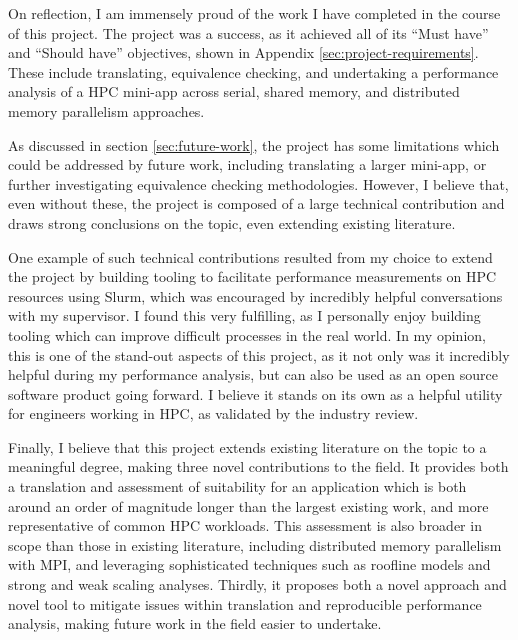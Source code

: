 On reflection, I am immensely proud of the work I have completed in the course of this project. The project was a success, as it achieved all of its ``Must have'' and ``Should have'' objectives, shown in Appendix \ref{sec:project-requirements}. These include translating, equivalence checking, and undertaking a performance analysis of a \acrshort{HPC} \acrshort{mini-app} across serial, shared memory, and distributed memory parallelism approaches.

As discussed in section \ref{sec:future-work}, the project has some limitations which could be addressed by future work, including translating a larger \acrshort{mini-app}, or further investigating equivalence checking methodologies. However, I believe that, even without these, the project is composed of a large technical contribution and draws strong conclusions on the topic, even extending existing literature.

One example of such technical contributions resulted from my choice to extend the project by building tooling to facilitate performance measurements on \acrshort{HPC} resources using Slurm, which was encouraged by incredibly helpful conversations with my supervisor. I found this very fulfilling, as I personally enjoy building tooling which can improve difficult processes in the real world. In my opinion, this is one of the stand-out aspects of this project, as it not only was it incredibly helpful during my performance analysis, but can also be used as an open source software product going forward. I believe it stands on its own as a helpful utility for engineers working in \acrshort{HPC}, as validated by the industry review.

Finally, I believe that this project extends existing literature on the topic to a meaningful degree, making three novel contributions to the field. It provides both a translation and assessment of suitability for an application which is both around an order of magnitude longer than the largest existing work, and more representative of common \acrshort{HPC} workloads. This assessment is also broader in scope than those in existing literature, including distributed memory parallelism with MPI, and leveraging sophisticated techniques such as roofline models and strong and weak scaling analyses. Thirdly, it proposes both a novel approach and novel tool to mitigate issues within translation and reproducible performance analysis, making future work in the field easier to undertake.


